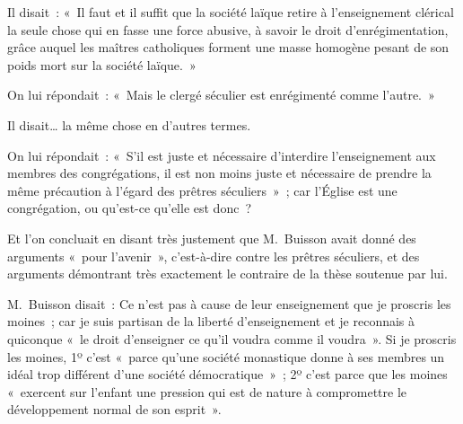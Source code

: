 \documentclass[french,twoside]{book} %
\begin{document}
\noindent Il disait : « Il faut et il suffit que la société laïque retire à l’enseignement clérical la seule chose qui en fasse une force abusive, à savoir le droit d’enrégimentation, grâce auquel les maîtres catholiques forment une masse homogène pesant de son poids mort sur la société laïque. »\par
On lui répondait : « Mais le clergé séculier est enrégimenté comme l’autre. »\par
Il disait… la même chose en d’autres termes.\par
On lui répondait : « S’il est juste et nécessaire d’interdire l’enseignement aux membres des congrégations, il est non moins juste et nécessaire de prendre la même précaution à l’égard des prêtres séculiers » ; car l’Église est une congrégation, ou qu’est-ce qu’elle est donc ?\par
Et l’on concluait en disant très justement que M. Buisson avait donné des arguments « pour l’avenir », c’est-à-dire contre les prêtres séculiers, et des arguments démontrant très exactement le contraire de la thèse soutenue par lui.\par
M. Buisson disait : Ce n’est pas à cause de leur enseignement que je proscris les moines ; car je suis partisan de la liberté d’enseignement et je reconnais à quiconque « le droit d’enseigner ce qu’il voudra comme il voudra ». Si je proscris les  moines, 1º c’est « parce qu’une société monastique donne à ses membres un idéal trop différent d’une société démocratique » ; 2º c’est parce que les moines « exercent sur l’enfant une pression qui est de nature à compromettre le développement normal de son esprit ».\par
\end{document}
